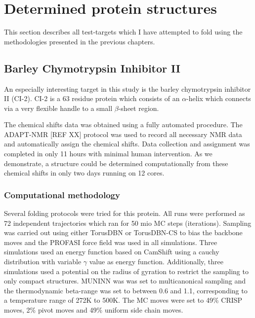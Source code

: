 \chapter{Determined protein structures}
This section describes all test-targets which I have attempted to fold using the methodologies presented in the previous chapters.

\section{Barley Chymotrypsin Inhibitor II}

An especially interesting target in this study is the barley chymotrypsin inhibitor II (CI-2). CI-2 is a 63 residue protein which consists of an $\alpha$-helix which connects via a very flexible handle to a small $\beta$-sheet region.

The chemical shifts data was obtained using a fully automated procedure.
The ADAPT-NMR [REF XX] protocol was used to record all necessary NMR data and automatically assign the chemical shifts.
Data collection and assignment was completed in only 11 hours with minimal human intervention.
As we demonstrate, a structure could be determined computationally from these chemical shifts in only two days running on 12 cores.



\subsection{Computational methodology}
Several folding protocols were tried for this protein. All runs were performed as 72 independent trajectories which ran for 50 mio MC steps (iterations). Sampling was carried out using either TorusDBN or TorusDBN-CS to bias the backbone moves and the PROFASI force field was used in all simulations. Three simulations used an energy function based on CamShift using a cauchy distribution with variable $\gamma$ value as energy function. Additionally, three simulations used a potential on the radius of gyration to restrict the sampling to only compact structures. MUNINN was was set to multicanonical sampling and the thermodynamic beta-range was set to between 0.6 and 1.1, corresponding to a temperature range of 272K to 500K. The MC moves were set to 49\% CRISP moves, 2\% pivot moves and 49\% uniform side chain moves.


